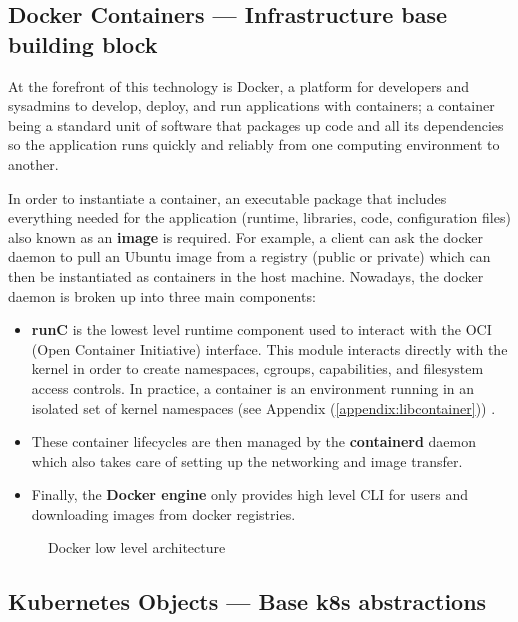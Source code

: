 \documentclass[11pt]{article}
\begin{document}
\subsection{Docker Containers — Infrastructure base building block}

\hspace{5mm} At the forefront of this technology is Docker, a platform for developers and sysadmins to develop, deploy, and run applications with containers; a container being a standard unit of software that packages up code and all its dependencies so the application runs quickly and reliably from one computing environment to another.

\vspace{2mm} In order to instantiate a container, an executable package that includes everything needed for the application (runtime, libraries, code, configuration files) also known as an \textbf{image} is required. For example, a client can ask the docker daemon to pull an Ubuntu image from a registry (public or private) which can then be instantiated as containers in the host machine. Nowadays, the docker daemon is broken up into three main components:

\begin{itemize}
    \item \textbf{runC} is the lowest level runtime component used to interact with the OCI (Open Container Initiative) interface. This module interacts directly with the kernel in order to create namespaces, cgroups, capabilities, and filesystem access controls. In practice, a container is an environment running in an isolated set of kernel namespaces (see Appendix (\ref{appendix:libcontainer})) .
    \item These container lifecycles are then managed by the \textbf{containerd} daemon which also takes care of setting up the networking and image transfer.   
    \item Finally, the \textbf{Docker engine} only provides high level CLI for users and downloading images from docker registries. 
\end{itemize}

\begin{figure}[h]
    \centering
    
    \caption{Docker low level architecture}
    \label{fig:docker_depth}
\end{figure}


\subsection{Kubernetes Objects — Base k8s abstractions}
\end{document}
